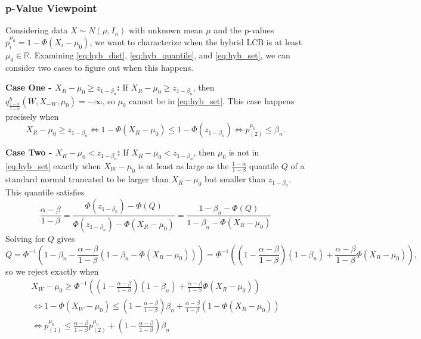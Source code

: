 \documentclass{article}
\newcommand{\R}{\mathbb{R}}
\begin{document}
\begin{appendix}
\subsubsection{p-Value Viewpoint} 


Considering data $X \sim N(\mu, I_n)$ with unknown mean $\mu$ and the p-values $p^{\mu_0
}_i = 1 - \Phi(X_i - \mu_0)$, we want to characterize when the hybrid LCB is at least $\mu_0 \in \R$. Examining \eqref{eq:hyb_dist}, \eqref{eq:hyb_quantile}, and \eqref{eq:hyb_set}, we can consider two cases to figure out when this happens. \newline 


\noindent \textbf{Case One - $X_R - \mu_0 \geq z_{1 - \beta_n}$:} If $X_R - \mu_0 \geq z_{1 - \beta_n}$, then $q^h_{\frac{1-\alpha}{1-\beta}}(W, X_{-W}, \mu_0) = -\infty$, so $\mu_0$ cannot be in \eqref{eq:hyb_set}. This case happens precisely when 
\begin{equation*}
    X_R-\mu_0 \geq z_{1 - \beta_n} \iff 1 - \Phi(X_R - \mu_0) \leq 1 - \Phi(z_{1- \beta_n}) \iff p^{\mu_0}_{(2)} \leq \beta_n.
\end{equation*}

\noindent \textbf{Case Two - $X_R - \mu_0 < z_{1 - \beta_n}$:} If $X_R - \mu_0 < z_{1 - \beta_n}$, then $\mu_0$ is not in \eqref{eq:hyb_set} exactly when $X_W - \mu_0$ is at least as large as the $\frac{1-\alpha}{1-\beta}$ quantile $Q$ of a standard normal truncated to be larger than $X_{R} - \mu_0$ but smaller than $z_{1- \beta_n}$. This quantile satisfies 
\begin{equation*}
    \frac{\alpha - \beta}{1- \beta} = \frac{\Phi(z_{1 - \beta_n})  - \Phi(Q) }{\Phi(z_{1-\beta_n})  - \Phi(X_R - \mu_0) } = \frac{1 - \beta_n  - \Phi(Q) }{1 - \beta_n - \Phi(X_R - \mu_0) } 
\end{equation*}
Solving for $Q$ gives 
\begin{equation*}
    Q = \Phi^{-1} \left(1 - \beta_n - \frac{\alpha - \beta}{1 - \beta}\left(1 - \beta_n - \Phi(X_{R} - \mu_0) \right) \right) = \Phi^{-1} \left( \left(1 - \frac{\alpha - \beta}{1 - \beta}\right) (1 - \beta_n) + \frac{\alpha-\beta}{1-\beta}\Phi(X_{R} - \mu_0) \right),
\end{equation*}
so we reject exactly when 
\begin{align*}
        X_{W} - \mu_0 \geq \Phi^{-1} \left( \left(1 - \frac{\alpha - \beta}{1 - \beta}\right) (1- \beta_n) + \frac{\alpha-\beta}{1-\beta}\Phi(X_{R} - \mu_0) \right) \\
        \iff 1 -\Phi(X_{W} - \mu_0) \leq \left(1 - \frac{\alpha - \beta}{1 - \beta}\right)\beta_n + \frac{\alpha-\beta}{1-\beta}(1-\Phi(X_{R} - \mu_0))  \\
        \iff p^{\mu_0}_{(1)} \leq \frac{\alpha-\beta}{1-\beta}p^{\mu_0}_{(2)}  + \left(1 - \frac{\alpha - \beta}{1 - \beta}\right)\beta_n \\
\end{align*}


\end{appendix}
\end{document}
